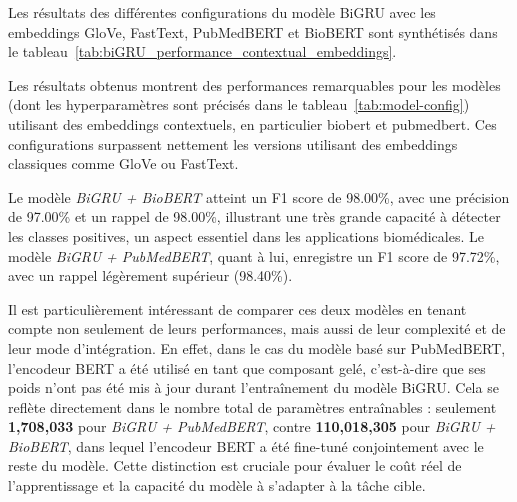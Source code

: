 \documentclass[12pt]{report}
\begin{document}
Les résultats des différentes configurations du modèle BiGRU avec les embeddings GloVe, FastText, PubMedBERT et BioBERT sont synthétisés dans le tableau~\ref{tab:biGRU_performance_contextual_embeddings}.

\begin{table}[H]
\centering
\renewcommand{\arraystretch}{1.2}
\caption{Performances des modèles BiGRU avec différents embeddings sur l'ensemble de test.}
\label{tab:biGRU_performance_contextual_embeddings}
\end{table}

Les résultats obtenus montrent des performances remarquables pour les modèles (dont les hyperparamètres sont précisés dans le tableau~\ref{tab:model-config}) utilisant des embeddings contextuels, en particulier \gls{biobert} et \gls{pubmedbert}. Ces configurations surpassent nettement les versions utilisant des embeddings classiques comme GloVe ou FastText.

Le modèle \textit{BiGRU + BioBERT} atteint un F1 score de 98.00\%, avec une précision de 97.00\% et un rappel de 98.00\%, illustrant une très grande capacité à détecter les classes positives, un aspect essentiel dans les applications biomédicales. Le modèle \textit{BiGRU + PubMedBERT}, quant à lui, enregistre un F1 score de 97.72\%, avec un rappel légèrement supérieur (98.40\%).

Il est particulièrement intéressant de comparer ces deux modèles en tenant compte non seulement de leurs performances, mais aussi de leur complexité et de leur mode d'intégration. En effet, dans le cas du modèle basé sur PubMedBERT, l'encodeur BERT a été utilisé en tant que composant gelé, c’est-à-dire que ses poids n'ont pas été mis à jour durant l'entraînement du modèle BiGRU. Cela se reflète directement dans le nombre total de paramètres entraînables : seulement \textbf{1,708,033} pour \textit{BiGRU + PubMedBERT}, contre \textbf{110,018,305} pour \textit{BiGRU + BioBERT}, dans lequel l’encodeur BERT a été fine-tuné conjointement avec le reste du modèle. Cette distinction est cruciale pour évaluer le coût réel de l'apprentissage et la capacité du modèle à s’adapter à la tâche cible.
\end{document}
